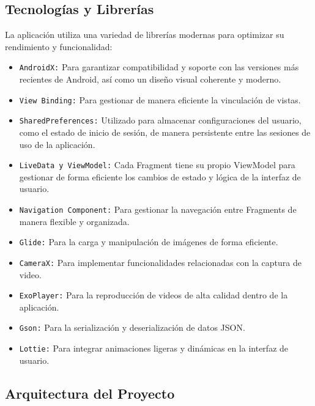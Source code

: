 
\subsection{Tecnologías y Librerías}

La aplicación utiliza una variedad de librerías modernas para optimizar su rendimiento y funcionalidad:

\begin{itemize}
    \item \texttt{AndroidX:} Para garantizar compatibilidad y soporte con las versiones más recientes de Android, así como un diseño visual coherente y moderno.
    \item \texttt{View Binding:} Para gestionar de manera eficiente la vinculación de vistas.
    \item \texttt{SharedPreferences:} Utilizado para almacenar configuraciones del usuario, como el estado de inicio de sesión, de manera persistente entre las sesiones de uso de la aplicación.
    \item \texttt{LiveData y ViewModel:} Cada Fragment tiene su propio ViewModel para gestionar de forma eficiente los cambios de estado y lógica de la interfaz de usuario.
    \item \texttt{Navigation Component:} Para gestionar la navegación entre Fragments de manera flexible y organizada.
    \item \texttt{Glide:} Para la carga y manipulación de imágenes de forma eficiente.
    \item \texttt{CameraX:} Para implementar funcionalidades relacionadas con la captura de video.
    \item \texttt{ExoPlayer:} Para la reproducción de videos de alta calidad dentro de la aplicación.
    \item \texttt{Gson:} Para la serialización y deserialización de datos JSON.
    \item \texttt{Lottie:} Para integrar animaciones ligeras y dinámicas en la interfaz de usuario.
\end{itemize}


\subsection{Arquitectura del Proyecto}


